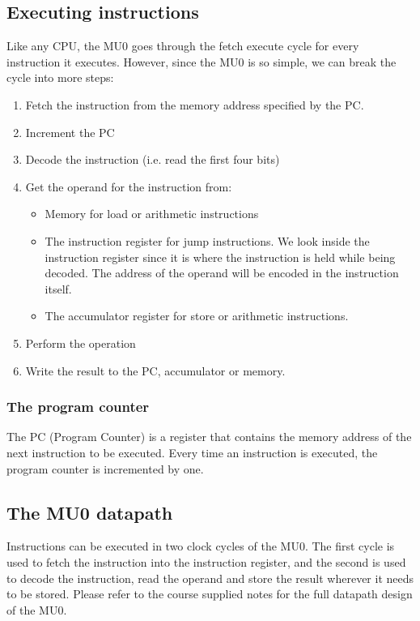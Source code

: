 \documentclass{article}
\begin{document}
\subsection{Executing instructions}

Like any CPU, the MU0 goes through the fetch execute cycle for every instruction
it executes. However, since the MU0 is so simple, we can break the cycle into
more steps:

\begin{enumerate}

	\item Fetch the instruction from the memory address specified by the PC.

	\item Increment the PC

	\item Decode the instruction (i.e. read the first four bits)

	\item Get the operand for the instruction from:
		\begin{itemize}
			\item Memory for load or arithmetic instructions
			\item The instruction register for jump instructions. We look inside
			the instruction register since it is where the instruction is held
			while being decoded. The address of the operand will be encoded in
			the instruction itself.
			\item The accumulator register for store or arithmetic instructions.
		\end{itemize}

	\item Perform the operation

	\item Write the result to the PC, accumulator or memory.
\end{enumerate}

\subsubsection{The program counter}

The PC (Program Counter) is a register that contains the memory address of the
next instruction to be executed. Every time an instruction is executed, the
program counter is incremented by one.

\subsection{The MU0 datapath}

Instructions can be executed in two clock cycles of the MU0. The first cycle is
used to fetch the instruction into the instruction register, and the second is
used to decode the instruction, read the operand and store the result wherever
it needs to be stored. Please refer to the course supplied notes for the full
datapath design of the MU0.
\end{document}
